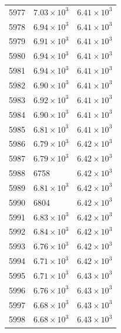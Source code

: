 \begin{table}[H]
\begin{tabular}{lll}
5977 & $\displaystyle 7.03 \times 10^{3}$ & $\displaystyle 6.41 \times 10^{3}$ \\
5978 & $\displaystyle 6.94 \times 10^{3}$ & $\displaystyle 6.41 \times 10^{3}$ \\
5979 & $\displaystyle 6.91 \times 10^{3}$ & $\displaystyle 6.41 \times 10^{3}$ \\
5980 & $\displaystyle 6.94 \times 10^{3}$ & $\displaystyle 6.41 \times 10^{3}$ \\
5981 & $\displaystyle 6.94 \times 10^{3}$ & $\displaystyle 6.41 \times 10^{3}$ \\
5982 & $\displaystyle 6.90 \times 10^{3}$ & $\displaystyle 6.41 \times 10^{3}$ \\
5983 & $\displaystyle 6.92 \times 10^{3}$ & $\displaystyle 6.41 \times 10^{3}$ \\
5984 & $\displaystyle 6.90 \times 10^{3}$ & $\displaystyle 6.41 \times 10^{3}$ \\
5985 & $\displaystyle 6.81 \times 10^{3}$ & $\displaystyle 6.41 \times 10^{3}$ \\
5986 & $\displaystyle 6.79 \times 10^{3}$ & $\displaystyle 6.42 \times 10^{3}$ \\
5987 & $\displaystyle 6.79 \times 10^{3}$ & $\displaystyle 6.42 \times 10^{3}$ \\
5988 & 6758 & $\displaystyle 6.42 \times 10^{3}$ \\
5989 & $\displaystyle 6.81 \times 10^{3}$ & $\displaystyle 6.42 \times 10^{3}$ \\
5990 & 6804 & $\displaystyle 6.42 \times 10^{3}$ \\
5991 & $\displaystyle 6.83 \times 10^{3}$ & $\displaystyle 6.42 \times 10^{3}$ \\
5992 & $\displaystyle 6.84 \times 10^{3}$ & $\displaystyle 6.42 \times 10^{3}$ \\
5993 & $\displaystyle 6.76 \times 10^{3}$ & $\displaystyle 6.42 \times 10^{3}$ \\
5994 & $\displaystyle 6.71 \times 10^{3}$ & $\displaystyle 6.42 \times 10^{3}$ \\
5995 & $\displaystyle 6.71 \times 10^{3}$ & $\displaystyle 6.43 \times 10^{3}$ \\
5996 & $\displaystyle 6.76 \times 10^{3}$ & $\displaystyle 6.43 \times 10^{3}$ \\
5997 & $\displaystyle 6.68 \times 10^{3}$ & $\displaystyle 6.43 \times 10^{3}$ \\
5998 & $\displaystyle 6.68 \times 10^{3}$ & $\displaystyle 6.43 \times 10^{3}$ \\

\end{tabular}
\end{table}
